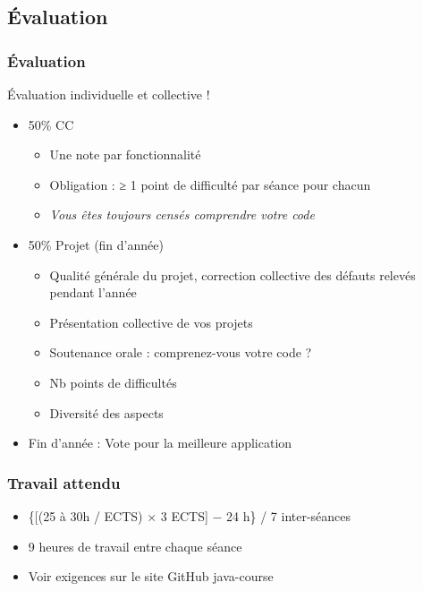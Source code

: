 \documentclass[english, french]{beamer}
\begin{document}
\subsection{Évaluation}
\begin{frame}
	\frametitle{Évaluation}
	 Évaluation individuelle et collective !
	\begin{itemize}
		\item 50\% CC
		\begin{itemize}
			\item Une note par fonctionnalité
			\item Obligation : ≥ 1 point de difficulté par séance pour chacun
			\item \emph{Vous êtes toujours censés comprendre votre code}
		\end{itemize}
		\item 50\% Projet (fin d’année)
		\begin{itemize}
			\item Qualité générale du projet, correction collective des défauts relevés pendant l’année
			\item Présentation collective de vos projets
			\item Soutenance orale : comprenez-vous votre code ?
			\item Nb points de difficultés
			\item Diversité des aspects
		\end{itemize}
		\item Fin d’année : Vote pour la meilleure application
	\end{itemize}
\end{frame}

\begin{frame}
	\frametitle{Travail attendu}
	\begin{itemize}
		\item \{[(25 à 30h / ECTS) × 3 ECTS] − 24 h\} / 7 inter-séances
		\item 9 heures de travail entre chaque séance
		\item Voir exigences sur le site GitHub java-course
	\end{itemize}
\end{frame}
\end{document}

